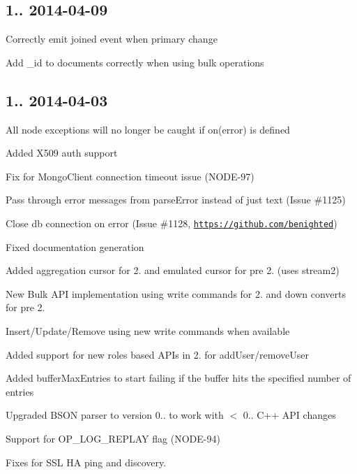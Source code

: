 \subsection*{1.. 2014-\/04-\/09 }


\begin{DoxyItemize}
\item Correctly emit joined event when primary change
\item Add \+\_\+id to documents correctly when using bulk operations
\end{DoxyItemize}

\subsection*{1.. 2014-\/04-\/03 }


\begin{DoxyItemize}
\item All node exceptions will no longer be caught if on(\textquotesingle{}error\textquotesingle{}) is defined
\item Added X509 auth support
\item Fix for Mongo\+Client connection timeout issue (N\+O\+D\+E-\/97)
\item Pass through error messages from parse\+Error instead of just text (Issue \#1125)
\item Close db connection on error (Issue \#1128, \href{https://github.com/benighted}{\tt https\+://github.\+com/benighted})
\item Fixed documentation generation
\item Added aggregation cursor for 2. and emulated cursor for pre 2. (uses stream2)
\item New Bulk A\+PI implementation using write commands for 2. and down converts for pre 2.
\item Insert/\+Update/\+Remove using new write commands when available
\item Added support for new roles based A\+PI\textquotesingle{}s in 2. for add\+User/remove\+User
\item Added buffer\+Max\+Entries to start failing if the buffer hits the specified number of entries
\item Upgraded B\+S\+ON parser to version 0.. to work with $<$ 0.. C++ A\+PI changes
\item Support for O\+P\+\_\+\+L\+O\+G\+\_\+\+R\+E\+P\+L\+AY flag (N\+O\+D\+E-\/94)
\item Fixes for S\+SL HA ping and discovery.

\end{DoxyItemize}
